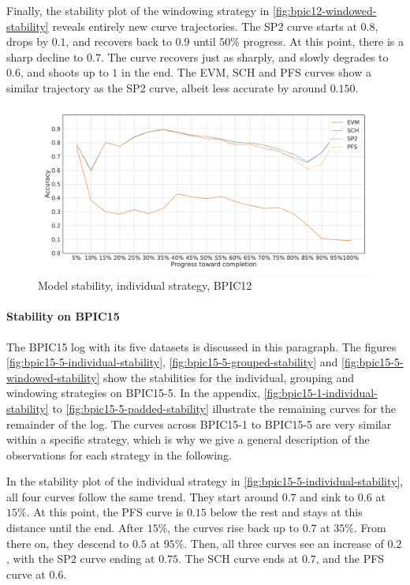 Finally, the stability plot of the windowing strategy in \autoref{fig:bpic12-windowed-stability} reveals entirely new curve trajectories.
The SP2 curve starts at $0.8$, drops by $0.1$, and recovers back to $0.9$ until $50\%$ progress.
At this point, there is a sharp decline to $0.7$.
The curve recovers just as sharply, and slowly degrades to $0.6$, and shoots up to $1$ in the end.
The EVM, SCH and PFS curves show a similar trajectory as the SP2 curve, albeit less accurate by around $0.150$.

\begin{figure}[!htb]
    \centering
    \includegraphics[width=\textwidth]{gfx/bpic2012/individual_stability.pdf}
    \caption{Model stability, individual strategy, BPIC12}
    \label{fig:bpic12-individual-stability}
\end{figure}
\FloatBarrier

\paragraph{Stability on BPIC15}
The BPIC15 log with its five datasets is discussed in this paragraph.
The figures \autoref{fig:bpic15-5-individual-stability}, \autoref{fig:bpic15-5-grouped-stability} and \autoref{fig:bpic15-5-windowed-stability} show the stabilities for the individual, grouping and windowing strategies on BPIC15-5.
In the appendix, \autoref{fig:bpic15-1-individual-stability} to \autoref{fig:bpic15-5-padded-stability} illustrate the remaining curves for the remainder of the log.
The curves across BPIC15-1 to BPIC15-5 are very similar within a specific strategy, which is why we give a general description of the observations for each strategy in the following.

In the stability plot of the individual strategy in \autoref{fig:bpic15-5-individual-stability}, all four curves follow the same trend.
They start around $0.7$ and sink to $0.6$ at $15\%$.
At this point, the PFS curve is $0.15$ below the rest and stays at this distance until the end.
After $15\%$, the curves rise back up to $0.7$ at $35\%$.
From there on, they descend to $0.5$ at $95\%$.
Then, all three curves see an increase of $0.2$, with the SP2 curve ending at $0.75$.
The SCH curve ends at $0.7$, and the PFS curve at $0.6$.

